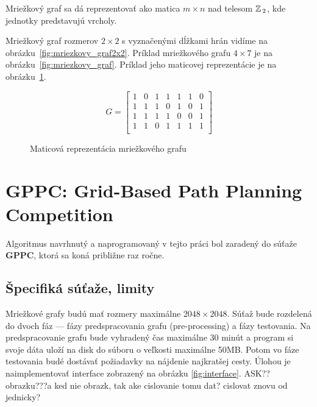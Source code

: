 \begin{note}
	Mriežkový graf sa dá reprezentovať ako matica $m \times n$ nad telesom $\mathbb{Z}\,_2$, kde jednotky predstavujú vrcholy. 
\end{note}
\begin{example}
Mriežkový graf rozmerov $2 \times 2$ s vyznačenými dĺžkami
hrán vidíme na obrázku~\ref{fig:mriezkovy_graf2x2}.
Príklad mriežkového grafu $4 \times 7$ je na obrázku~\ref{fig:mriezkovy_graf}.
Príklad jeho maticovej reprezentácie je na obrázku~\ref{fig:maticova_reprezentacia}.

\end{example}


\begin{figure}[h]


\[
G =
  \begin{bmatrix}
    1 & 0 & 1 & 1 & 1 & 1 & 0\\
	1 & 1 & 1 & 0 & 1 & 0 & 1\\
	1 & 1 & 1 & 1 & 0 & 0 & 1\\
	1 & 1 & 0 & 1 & 1 & 1 & 1\\
  \end{bmatrix}
\]

\caption{Maticová reprezentácia mriežkového grafu}
\label{fig:maticova_reprezentacia}
\end{figure}




\section{GPPC: Grid-Based Path Planning Competition}
Algoritmus navrhnutý a naprogramovaný v tejto práci bol zaradený do súťaže \textbf{GPPC}, ktorá sa koná približne raz ročne.

\subsection{Špecifiká súťaže, limity}

Mriežkové grafy budú mať rozmery maximálne $2048 \times 2048$.
Súťaž bude rozdelená do dvoch fáz --- fázy predspracovania grafu (pre-processing)
a fázy testovania. Na predspracovanie grafu bude vyhradený čas
maximálne 30 minút a program si svoje dáta uloží na disk do súboru o veľkosti maximálne 50MB.
Potom vo fáze testovania budé dostávať požiadavky na nájdenie najkratšej cesty. Úlohou je naimplementovať interface zobrazený na obrázku \ref{fig:interface}. ASK?? obrazku???a ked nie obrazk, tak ake cislovanie tomu dat? cislovat znovu od jednicky?

